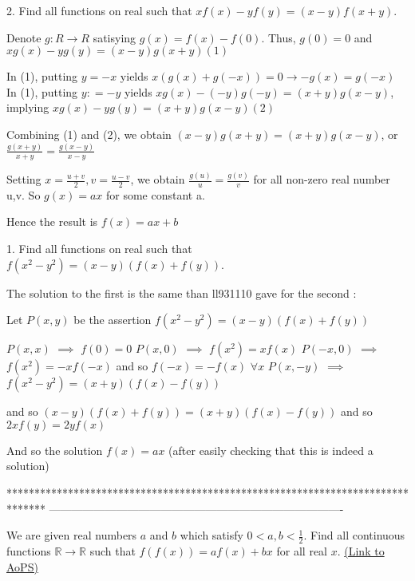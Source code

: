 \begin{solution}
	\begin{tcolorbox}
2. Find all functions on real such that $ xf(x) - yf(y) = (x - y)f(x + y)$.\end{tcolorbox}

Denote $ g: R \rightarrow R$ satisying $ g(x) = f(x) - f(0)$. Thus, $ g(0) = 0$ and
$ xg(x) - yg(y) = (x - y)g(x + y) (1)$

In (1), putting $ y = - x$ yields $ x(g(x) + g( - x)) = 0 \rightarrow - g(x) = g( - x)$
In (1), putting $ y : = - y$ yields $ xg(x) - ( - y)g( - y) = (x + y)g(x - y)$, implying $ xg(x) - yg(y) = (x + y)g(x - y) (2)$

Combining (1) and (2), we obtain $ (x - y)g(x + y) = (x + y)g(x - y)$, or $ \frac {g(x + y)}{x + y} = \frac {g(x - y)}{x - y}$

Setting $ x = \frac {u + v}{2}, v = \frac {u - v}{2}$, we obtain $ \frac {g(u)}{u} = \frac {g(v)}{v}$ for all non-zero real number u,v. So $ g(x) = ax$ for some constant a.

Hence the result is $ f(x) = ax + b$
\end{solution}



\begin{solution}
	\begin{tcolorbox}1. Find all functions on real such that $ f(x^2 - y^2) = (x - y)(f(x) + f(y))$.\end{tcolorbox}
The solution to the first is the same than ll931110 gave for the second :

Let $ P(x,y)$ be the assertion $ f(x^2 - y^2) = (x - y)(f(x) + f(y))$

$ P(x,x)$ $ \implies$ $ f(0)=0$
$ P(x,0)$ $ \implies$ $ f(x^2)=xf(x)$
$ P(-x,0)$ $ \implies$ $ f(x^2)=-xf(-x)$ and so $ f(-x)=-f(x)$ $ \forall x$
$ P(x,-y)$ $ \implies$ $ f(x^2-y^2)=(x+y)(f(x)-f(y))$

and so $ (x - y)(f(x) + f(y))=(x+y)(f(x)-f(y))$
and so $ 2xf(y)=2yf(x)$ 

And so the solution $ \boxed{f(x)=ax}$ (after easily checking that this is indeed a solution)
\end{solution}
*******************************************************************************
-------------------------------------------------------------------------------

\begin{problem}
	We are given real numbers $a$ and $b$ which satisfy $ 0<a,b< \frac{1}{2}$. Find all continuous functions $ \mathbb R \to \mathbb R$ such that $ f(f(x))=af(x)+bx$ for all real $x$.
	\flushright \href{https://artofproblemsolving.com/community/c6h309540}{(Link to AoPS)}
\end{problem}



